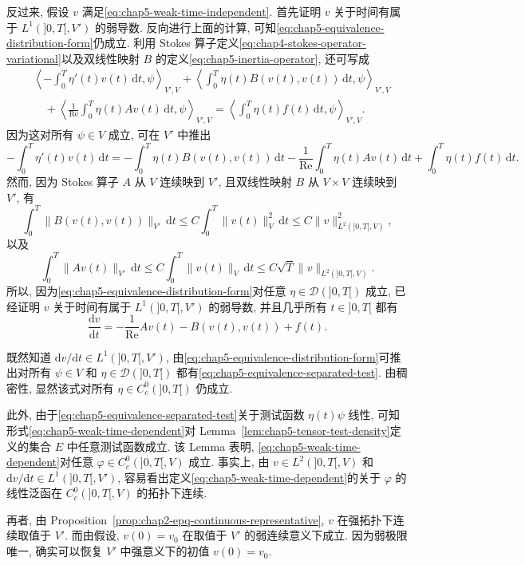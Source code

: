 \begin{Proof}
反过来, 假设 $v$ 满足\eqref{eq:chap5-weak-time-independent}. 首先证明 $v$ 关于时间有属于 $L^1(]0,T[,V')$ 的弱导数. 反向进行上面的计算, 可知\eqref{eq:chap5-equivalence-distribution-form}仍成立. 利用 Stokes 算子定义\eqref{eq:chap4-stokes-operator-variational}以及双线性映射 $B$ 的定义\eqref{eq:chap5-inertia-operator}, 还可写成
\begin{align*}
 &\left\langle-\int_0^T\eta'(t)v(t)\,\mathrm dt,\psi\right\rangle_{V',V}
 +\left\langle\int_0^T\eta(t)B(v(t),v(t))\,\mathrm dt,\psi\right\rangle_{V',V}\\
 &\quad+\left\langle\frac1{\operatorname{Re}}\int_0^T\eta(t)Av(t)\,\mathrm dt,\psi\right\rangle_{V',V}
 =\left\langle\int_0^T\eta(t)f(t)\,\mathrm dt,\psi\right\rangle_{V',V}.
\end{align*}
因为这对所有 $\psi\in V$ 成立, 可在 $V'$ 中推出
\[
 -\int_0^T\eta'(t)v(t)\,\mathrm dt
 =-\int_0^T\eta(t)B(v(t),v(t))\,\mathrm dt
 -\frac1{\operatorname{Re}}\int_0^T\eta(t)Av(t)\,\mathrm dt
 +\int_0^T\eta(t)f(t)\,\mathrm dt.
\]
然而, 因为 Stokes 算子 $A$ 从 $V$ 连续映到 $V'$, 且双线性映射 $B$ 从 $V\times V$ 连续映到 $V'$, 有
\[
 \int_0^T\|B(v(t),v(t))\|_{V'}\,\mathrm dt
 \leq C\int_0^T\|v(t)\|_V^2\,\mathrm dt
 \leq C\|v\|_{L^2(]0,T[,V)}^2,
\]
以及
\[
 \int_0^T\|Av(t)\|_{V'}\,\mathrm dt
 \leq C\int_0^T\|v(t)\|_V\,\mathrm dt
 \leq C\sqrt T\|v\|_{L^2(]0,T[,V)}.
\]
所以, 因为\eqref{eq:chap5-equivalence-distribution-form}对任意 $\eta\in\mathcal D(]0,T[)$ 成立, 已经证明 $v$ 关于时间有属于 $L^1(]0,T[,V')$ 的弱导数, 并且几乎所有 $t\in]0,T[$ 都有
\[
 \frac{\mathrm dv}{\mathrm dt}=-\frac1{\operatorname{Re}}Av(t)-B(v(t),v(t))+f(t).
\]

既然知道 $\mathrm dv/\mathrm dt\in L^1(]0,T[,V')$, 由\eqref{eq:chap5-equivalence-distribution-form}可推出对所有 $\psi\in V$ 和 $\eta\in\mathcal D(]0,T[)$ 都有\eqref{eq:chap5-equivalence-separated-test}. 由稠密性, 显然该式对所有 $\eta\in C_c^0(]0,T[)$ 仍成立.

此外, 由于\eqref{eq:chap5-equivalence-separated-test}关于测试函数 $\eta(t)\psi$ 线性, 可知形式\eqref{eq:chap5-weak-time-dependent}对 Lemma~\ref{lem:chap5-tensor-test-density}定义的集合 $E$ 中任意测试函数成立. 该 Lemma 表明, \eqref{eq:chap5-weak-time-dependent}对任意 $\varphi\in C_c^0(]0,T[,V)$ 成立. 事实上, 由 $v\in L^2(]0,T[,V)$ 和 $\mathrm dv/\mathrm dt\in L^1(]0,T[,V')$, 容易看出定义\eqref{eq:chap5-weak-time-dependent}的关于 $\varphi$ 的线性泛函在 $C_c^0(]0,T[,V)$ 的拓扑下连续.

再者, 由 Proposition~\ref{prop:chap2-epq-continuous-representative}, $v$ 在强拓扑下连续取值于 $V'$. 而由假设, $v(0)=v_0$ 在取值于 $V'$ 的弱连续意义下成立. 因为弱极限唯一, 确实可以恢复 $V'$ 中强意义下的初值 $v(0)=v_0$.
\end{Proof}

